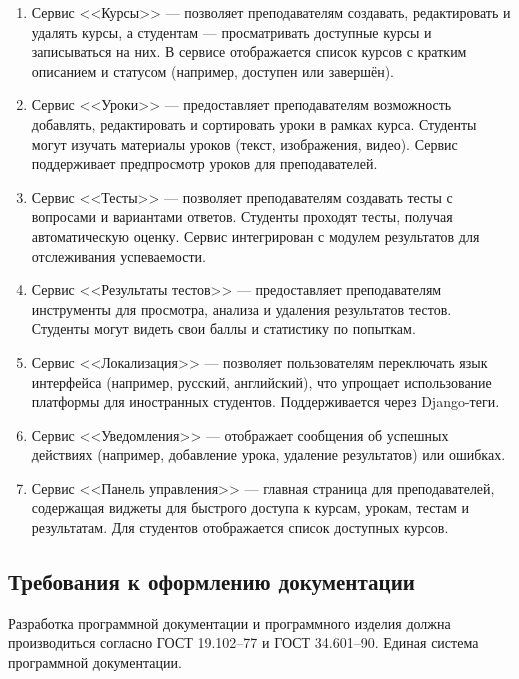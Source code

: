 \begin{enumerate}
	\item Сервис <<Курсы>> — позволяет преподавателям создавать, редактировать и удалять курсы, а студентам --- просматривать доступные курсы и записываться на них. В сервисе отображается список курсов с кратким описанием и статусом (например, доступен или завершён).
	
	\item Сервис <<Уроки>> — предоставляет преподавателям возможность добавлять, редактировать и сортировать уроки в рамках курса. Студенты могут изучать материалы уроков (текст, изображения, видео). Сервис поддерживает предпросмотр уроков для преподавателей.
	
	\item Сервис <<Тесты>> — позволяет преподавателям создавать тесты с вопросами и вариантами ответов. Студенты проходят тесты, получая автоматическую оценку. Сервис интегрирован с модулем результатов для отслеживания успеваемости.
	
	\item Сервис <<Результаты тестов>> — предоставляет преподавателям инструменты для просмотра, анализа и удаления результатов тестов. Студенты могут видеть свои баллы и статистику по попыткам.
	
	\item Сервис <<Локализация>> — позволяет пользователям переключать язык интерфейса (например, русский, английский), что упрощает использование платформы для иностранных студентов. Поддерживается через Django-теги.
	
	\item Сервис <<Уведомления>> — отображает сообщения об успешных действиях (например, добавление урока, удаление результатов) или ошибках.
	
	\item Сервис <<Панель управления>> — главная страница для преподавателей, содержащая виджеты для быстрого доступа к курсам, урокам, тестам и результатам. Для студентов отображается список доступных курсов.
	
\end{enumerate}

\subsection{Требования к оформлению документации}

Разработка программной документации и программного изделия должна производиться согласно ГОСТ 19.102–77 и ГОСТ 34.601–90. Единая система программной документации.
